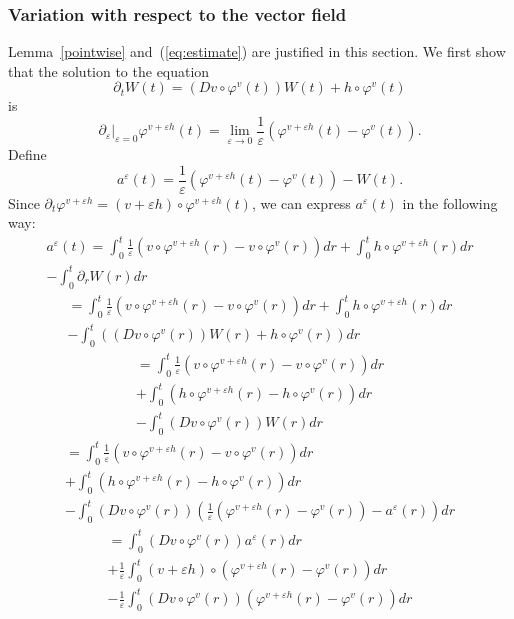 \documentclass[a5paper,11pt,twoside]{article}
\theoremstyle{plain}
\theoremstyle{definition}
\begin{document}
\subsubsection{Variation with respect to the vector field}
Lemma~\ref{pointwise} and~(\ref{eq:estimate}) are justified in this section. We first show that the solution to the equation
\[
\partial_t W(t)=\left(Dv\circ \varphi^v(t)\right)W(t)+h\circ \varphi^v(t)
\]
is
\[
\left.\partial_\varepsilon\right|_{\varepsilon=0}\varphi^{v+\varepsilon h}(t)=\lim_{\varepsilon\to 0}\frac{1}{\varepsilon}\left(\varphi^{v+\varepsilon h}(t)-\varphi^v(t)\right).
\]
Define
\[
a^\varepsilon(t)=\frac{1}{\varepsilon}\left(\varphi^{v+\varepsilon h}(t)-\varphi^v(t)\right)-W(t).
\]
Since $\partial_t\varphi^{v+\varepsilon h}=(v+\varepsilon h)\circ\varphi^{v+\varepsilon h}(t)$, we can express $a^\varepsilon(t)$ in the following way:
%
\begin{multline*}
a^\varepsilon(t)=\int_0^t \frac{1}{\varepsilon}\left(v\circ\varphi^{v+\varepsilon h}(r)-v\circ\varphi^v(r)\right)dr+\int_0^t h\circ \varphi^{v+\varepsilon h}(r)dr \\-\int_0^t\partial_rW(r)dr
\end{multline*}
\begin{multline*}
=\int_0^t \frac{1}{\varepsilon}\left(v\circ\varphi^{v+\varepsilon h}(r)-v\circ\varphi^v(r)\right)dr+\int_0^t h\circ \varphi^{v+\varepsilon h}(r)dr \\-\int_0^t\left(\left(Dv\circ \varphi^v(r)\right)W(r)+h\circ \varphi^v(r)\right)dr
\end{multline*}
\begin{multline*}
=\int_0^t \frac{1}{\varepsilon}\left(v\circ\varphi^{v+\varepsilon h}(r)-v\circ\varphi^v(r)\right)dr\\+\int_0^t \left(h\circ \varphi^{v+\varepsilon h}(r)-h\circ \varphi^v(r)\right)dr \\-\int_0^t\left(Dv\circ \varphi^v(r)\right)W(r)dr
\end{multline*}
\begin{multline*}
=\int_0^t \frac{1}{\varepsilon}\left(v\circ\varphi^{v+\varepsilon h}(r)-v\circ\varphi^v(r)\right)dr\\+\int_0^t \left(h\circ \varphi^{v+\varepsilon h}(r)-h\circ \varphi^v(r)\right)dr \\-\int_0^t\left(Dv\circ \varphi^v(r)\right)\left(\frac{1}{\varepsilon}\left(\varphi^{v+\varepsilon h}(r)-\varphi^v(r)\right)-a^\varepsilon(r)\right)dr
\end{multline*}
\begin{multline*}
=\int_0^t\left(Dv\circ \varphi^v(r)\right)a^\varepsilon(r)dr\\+\frac{1}{\varepsilon}\int_0^t (v+\varepsilon h)\circ\left(\varphi^{v+\varepsilon h}(r)-\varphi^v(r)\right)dr \\-\frac{1}{\varepsilon}\int_0^t\left(Dv\circ \varphi^v(r)\right)\left(\varphi^{v+\varepsilon h}(r)-\varphi^v(r)\right)dr
\end{multline*}
\end{document}
